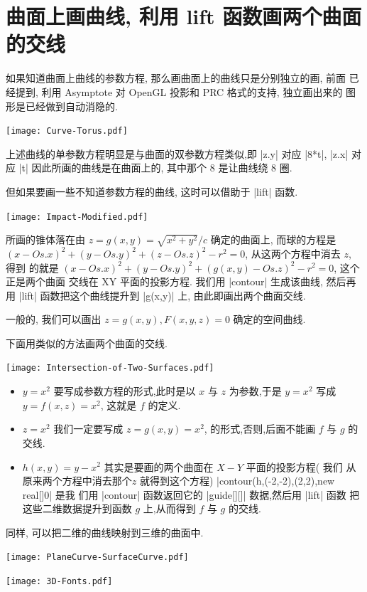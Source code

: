 \documentclass[nofonts,CJKnormalspaces]{ctexbook}
\begin{document}
\section{曲面上画曲线, 利用 lift 函数画两个曲面的交线}
如果知道曲面上曲线的参数方程, 那么画曲面上的曲线只是分别独立的画, 前面
已经提到, 利用 Asymptote 对 OpenGL 投影和 PRC 格式的支持, 独立画出来的
图形是已经做到自动消隐的.
\begin{center}\texttt{[image: Curve-Torus.pdf]}\end{center}%

上述曲线的单参数方程明显是与曲面的双参数方程类似,即 |z.y| 对应 |8*t|,
|z.x| 对应 |t| 因此所画的曲线是在曲面上的, 其中那个 8 是让曲线绕 8 圈.

但如果要画一些不知道参数方程的曲线, 这时可以借助于 |lift| 函数.
\begin{center}\texttt{[image: Impact-Modified.pdf]}\end{center}%

所画的锥体落在由 $z=g(x,y)=\sqrt{x^2+y^2}/c$ 确定的曲面上, 而球的方程是
$(x-Os.x)^2+(y-Os.y)^2+(z-Os.z)^2-r^2=0$, 从这两个方程中消去 $z$, 得到
的就是 $(x-Os.x)^2+(y-Os.y)^2+(g(x,y)-Os.z)^2-r^2=0$, 这个正是两个曲面
交线在 XY 平面的投影方程. 我们用 |contour| 生成该曲线, 然后再用 |lift|
函数把这个曲线提升到 |g(x,y)| 上, 由此即画出两个曲面交线.

一般的, 我们可以画出 $z=g(x,y), F(x,y,z)=0$ 确定的空间曲线.

下面用类似的方法画两个曲面的交线.
\begin{center}\texttt{[image: Intersection-of-Two-Surfaces.pdf]}\end{center}%

\begin{itemize}
\item $y=x^2$ 要写成参数方程的形式,此时是以 $x$ 与 $z$ 为参数,于是
  $y=x^2$ 写成  $y=f(x,z)=x^2$, 这就是 $f$ 的定义.
\item $z=x^2$ 我们一定要写成 $z=g(x,y)=x^2$, 的形式,否则,后面不能画 $f$ 与 $g$ 的交线.
\item $h(x,y)=y-x^2$ 其实是要画的两个曲面在 $X-Y$ 平面的投影方程( 我们
  从原来两个方程中消去那个$z$ 就得到这个方程)
  |contour(h,(-2,-2),(2,2),new real[]{0}|   是我
  们用  |contour| 函数返回它的 |guide[][]| 数据,然后用 |lift| 函数
  把这些二维数据提升到函数 $g$ 上,从而得到 $f$ 与 $g$ 的交线.
\end{itemize}
同样, 可以把二维的曲线映射到三维的曲面中.
\begin{center}\texttt{[image: PlaneCurve-SurfaceCurve.pdf]}\end{center}%

\begin{center}\texttt{[image: 3D-Fonts.pdf]}\end{center}%

\end{document}
